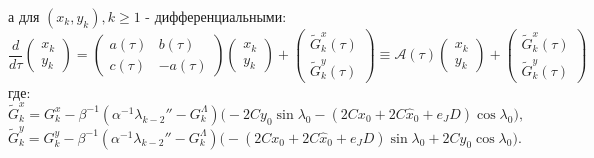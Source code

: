 а для $(x_k,y_k), k \ge 1$ - дифференциальными:
\begin{equation}
\frac{d}{d\tau} \begin{pmatrix} x_k \\ y_k \end{pmatrix} = \begin{pmatrix} a(\tau) & b(\tau)\\ c(\tau) & -a(\tau) \end{pmatrix} \begin{pmatrix} x_k \\ y_k \end{pmatrix} + \begin{pmatrix} \tilde G_k^x(\tau) \\ \tilde G_k^y(\tau) \end{pmatrix} \equiv \mathcal{A}(\tau) \begin{pmatrix} x_k \\ y_k \end{pmatrix} + \begin{pmatrix} \tilde G_k^x(\tau) \\ \tilde G_k^y(\tau) \end{pmatrix}
\label{xy_eq}
\end{equation}
где:
$$ \tilde G_k^x = G_k^x - \beta^{-1} (\alpha^{-1} \lambda_{k-2}'' - G_k^\Lambda) \big( -2Cy_0 \sin\lambda_0 - (2Cx_0+2C \hat x_0+e_JD) \cos\lambda_0 \big), $$
$$ \tilde G_k^y = G_k^y - \beta^{-1} (\alpha^{-1} \lambda_{k-2}'' - G_k^\Lambda) \big( -(2Cx_0+2C \hat x_0+e_JD) \sin\lambda_0 + 2Cy_0 \cos\lambda_0 \big). $$


